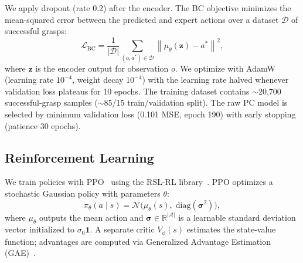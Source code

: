 \documentclass[letterpaper, 10 pt, conference]{ieeeconf}
\begin{document}
We apply dropout (rate 0.2) after the encoder.
The BC objective minimizes the mean-squared error between the predicted and expert actions over a dataset $\mathcal{D}$ of successful grasps:
\begin{equation}
    \mathcal{L}_{\text{BC}} = \frac{1}{|\mathcal{D}|}\sum_{(o,a^*)\in\mathcal{D}} \left\| \mu_\theta(\mathbf{z}) - a^* \right\|^2,
\end{equation}
where $\mathbf{z}$ is the encoder output for observation $o$.
We optimize with AdamW~\cite{loshchilov2019adamw} (learning rate $10^{-4}$, weight decay $10^{-4}$) with the learning rate halved whenever validation loss plateaus for 10 epochs.
The training dataset contains $\sim$20{,}700 successful-grasp samples ($\sim$85/15 train/validation split). The raw PC model is selected by minimum validation loss (0.101 MSE, epoch 190) with early stopping (patience 30 epochs).

\subsection{Reinforcement Learning}
\label{sec:rl}
We train policies with PPO~\cite{schulman2017ppo} using the RSL-RL library~\cite{rudin2022learning}.
PPO optimizes a stochastic Gaussian policy with parameters $\theta$:
\begin{equation}
    \pi_\theta(a \mid s) = \mathcal{N}\!\big(\mu_\theta(s),\;\mathrm{diag}(\bm{\sigma}^2)\big),
\end{equation}
where $\mu_\theta$ outputs the mean action and $\bm{\sigma} \in \mathbb{R}^{|\mathcal{A}|}$ is a learnable standard deviation vector initialized to $\sigma_0 \mathbf{1}$.
A separate critic $V_\phi(s)$ estimates the state-value function; advantages are computed via Generalized Advantage Estimation (GAE)~\cite{schulman2017ppo}.
\end{document}
